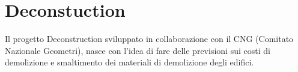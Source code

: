 \section{Deconstuction}
\label{sec:chapter_4_section_2}

Il progetto Deconstruction sviluppato in collaborazione con il CNG (Comitato Nazionale Geometri), nasce con l'idea di fare delle previsioni
sui costi di demolizione e smaltimento dei materiali di demolizione degli edifici.
\newpage
